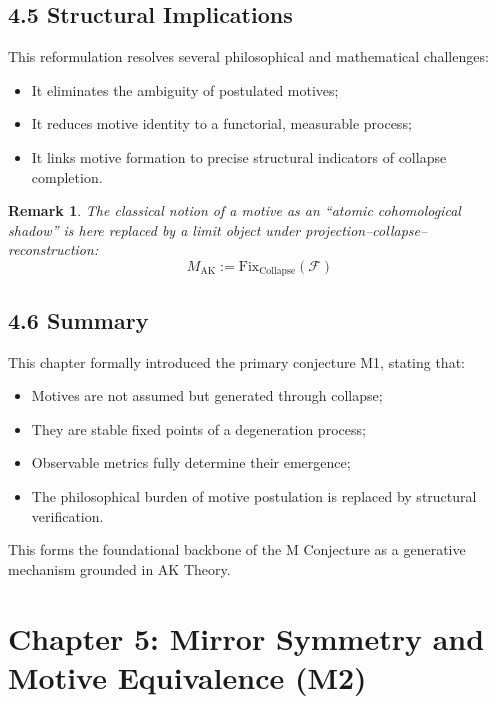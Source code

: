 \documentclass[11pt]{article}
\newtheorem{remark}[theorem]{Remark}
\begin{document}
\subsection{4.5 Structural Implications}

This reformulation resolves several philosophical and mathematical challenges:

\begin{itemize}
    \item It eliminates the ambiguity of postulated motives;
    \item It reduces motive identity to a functorial, measurable process;
    \item It links motive formation to precise structural indicators of collapse completion.
\end{itemize}

\begin{remark}
The classical notion of a motive as an “atomic cohomological shadow” is here replaced by a limit object under projection–collapse–reconstruction:
\[
M_{\mathrm{AK}} := \mathrm{Fix}_{\mathrm{Collapse}}(\mathcal{F})
\]
\end{remark}

\subsection{4.6 Summary}

This chapter formally introduced the primary conjecture M1, stating that:

\begin{itemize}
    \item Motives are not assumed but generated through collapse;
    \item They are stable fixed points of a degeneration process;
    \item Observable metrics fully determine their emergence;
    \item The philosophical burden of motive postulation is replaced by structural verification.
\end{itemize}

This forms the foundational backbone of the M Conjecture as a generative mechanism grounded in AK Theory.

\FloatBarrier




\section{Chapter 5: Mirror Symmetry and Motive Equivalence (M2)}
\end{document}
